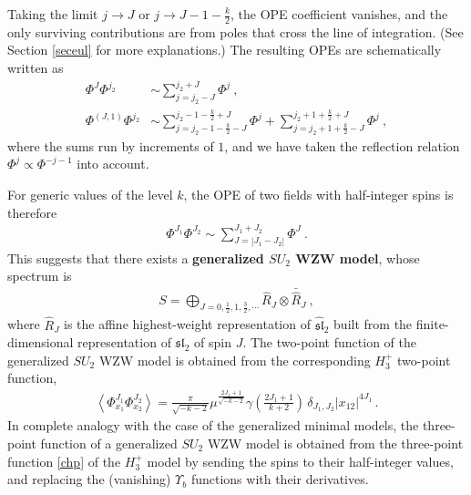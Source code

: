 \documentclass[12pt, a4paper, notitlepage, twoside]{report}
\numberwithin{equation}{section}
\theoremstyle{break}
\begin{document}
Taking the limit $j\to J$ or $j\to J-1-\frac{k}{2}$, the OPE coefficient vanishes, and the only surviving contributions are from poles that cross the line of integration. (See Section \ref{seceul} for more explanations.) The resulting OPEs are schematically written as 
\begin{align}
 \Phi^J \Phi^{j_2} & \sim \sum_{j=j_2-J}^{j_2+J} \Phi^j \ ,
\label{pjp}
\\
\Phi^{(J,1)}\Phi^{j_2} & \sim \sum_{j=j_2-1-\frac{k}{2}-J}^{j_2-1-\frac{k}{2}+J} \Phi^j + \sum_{j=j_2+1+\frac{k}{2}-J}^{j_2+1+\frac{k}{2}+J} \Phi^j\ ,
\label{pjop}
\end{align}
where the sums run by increments of $1$, and we have taken the reflection relation $\Phi^j\propto \Phi^{-j-1}$ into account. 

For generic values of the level $k$, the OPE of two fields with half-integer spins is therefore 
\begin{align}
 \boxed{\Phi^{J_1}\Phi^{J_2} \sim \sum_{J=|J_1-J_2|}^{J_1+J_2} \Phi^J}\ .
\end{align}
This suggests that there exists a \textbf{\boldmath generalized $SU_2$ WZW model}, whose spectrum is 
\begin{align}
 \boxed{S = \bigoplus_{J=0,\frac12,1,\frac32,\cdots} \hat{R}_J \otimes \bar{\hat{R}}_J}\ ,
\end{align}
where $\hat{R}_J$ is the affine highest-weight representation of $\widehat{\mathfrak{sl}}_2$ built from the finite-dimensional representation of $\mathfrak{sl}_2$ of spin $J$.
The two-point function of the generalized $SU_2$ WZW model is obtained from the corresponding $H_3^+$ two-point function, 
\begin{align}
 \left\langle \Phi^{J_1}_{x_1} \Phi^{J_2}_{x_2} \right\rangle = \frac{\pi}{\sqrt{-k-2}}\mu^{\frac{2J_1+1}{\sqrt{-k-2}}} \gamma(\tfrac{2J_1+1}{k+2})\, \delta_{J_1,J_2}|x_{12}|^{4J_1}\, .
\label{pjpjd}
\end{align}
In complete analogy with the case of the generalized minimal models, the three-point function of a generalized $SU_2$ WZW model is obtained from the three-point function \eqref{chp} of the $H_3^+$ model by sending the spins to their half-integer values, and replacing the (vanishing) $\Upsilon_b$ functions with their derivatives. 
\end{document}
